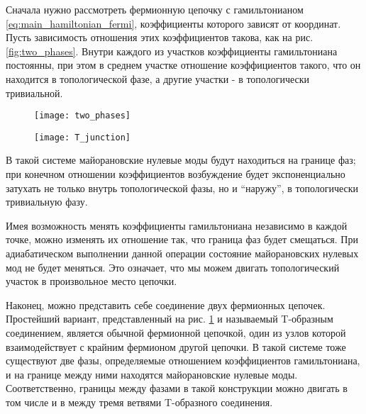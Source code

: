 \documentclass[a4paper,12pt]{article}
\theoremstyle{plain} %
\theoremstyle{definition} %
\theoremstyle{remark} %
\begin{document}
Сначала нужно рассмотреть фермионную цепочку с гамильтонианом \ref{eq:main_hamiltonian_fermi}, коэффициенты которого зависят от координат. Пусть зависимость отношения этих коэффициентов такова, как на рис. \ref{fig:two_phases}. Внутри каждого из участков коэффициенты гамильтониана постоянны, при этом в среднем участке отношение коэффициентов такого, что он находится в топологической фазе, а другие участки - в топологически тривиальной.

\begin{figure}
    \centering
    \begin{minipage}{.5\textwidth}
        \centering
        \texttt{[image: two\_phases]}
        \captionsetup{width=0.9\textwidth}
        \label{fig:two_phases}
    \end{minipage}%
    \begin{minipage}{.5\textwidth}
        \centering
        \texttt{[image: T\_junction]}
        \captionsetup{width=0.9\textwidth}
        \label{fig:t_junction}
    \end{minipage}
\end{figure}

В такой системе майорановские нулевые моды будут находиться на границе фаз; при конечном отношении коэффициентов возбуждение будет экспоненциально затухать не только внутрь топологической фазы, но и ``наружу'', в топологически тривиальную фазу.

Имея возможность менять коэффициенты гамильтониана независимо в каждой точке, можно изменять их отношение так, что граница фаз будет смещаться. При адиабатическом выполнении данной операции состояние майорановских нулевых мод не будет меняться. Это означает, что мы можем двигать топологический участок в произвольное место цепочки.

Наконец, можно представить себе соединение двух фермионных цепочек. Простейший вариант, представленный на рис. \ref{fig:t_junction} и называемый T-\hspace{0pt}образным соединением, является обычной фермионной цепочкой, один из узлов которой взаимодействует с крайним фермионом другой цепочки. В такой системе тоже существуют две фазы, определяемые отношением коэффициентов гамильтониана, и на границе между ними находятся майорановские нулевые моды. Соответственно, границы между фазами в такой конструкции можно двигать в том числе и в между тремя ветвями T-\hspace{0pt}образного соединения.
\end{document}
